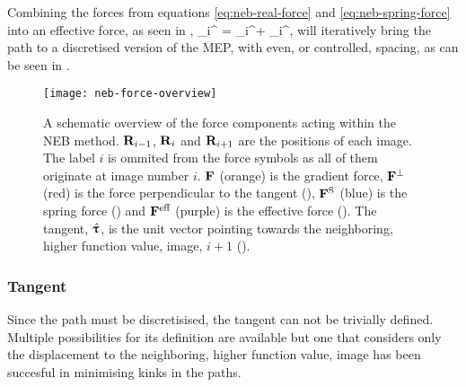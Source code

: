 Combining the forces from equations \ref{eq:neb-real-force} and \ref{eq:neb-spring-force} into an effective force, as seen in ,
\vF_i^ = \vF_i^\perp + \vF_i^,
\eeq
will iteratively bring the path to a discretised version of the MEP, with even, or controlled, spacing, as can be seen in .

\begin{figure}[h]
\begin{center}
\texttt{[image: neb-force-overview]}
\parbox{0.85\linewidth}{\caption{A schematic overview of the force components acting within the NEB method.
${\mathrm{\mathbf{\bm{R}}}}_{i-1}$, ${\mathrm{\mathbf{\bm{R}}}}_i$ and ${\mathrm{\mathbf{\bm{R}}}}_{i+1}$ are the positions of each image.
The label $i$ is ommited from the force symbols as all of them originate at image number $i$.
${\mathrm{\mathbf{\bm{F}}}}$ (orange) is the gradient force,
${\mathrm{\mathbf{\bm{F}}}}^\perp$ (red) is the force perpendicular to the tangent (),
${\mathrm{\mathbf{\bm{F}}}}^\text{S}$ (blue) is the spring force () and
${\mathrm{\mathbf{\bm{F}}}}^\text{eff}$ (purple) is the effective force ().
The tangent, $\hat{{\mathrm{\mathbf{\bm{\uptau}}}}}$, is the unit vector pointing towards the neighboring, higher function value, image, $i+1$ ().
}
\label{fig:neb-force-overview}
}
\end{center}
\end{figure}

\subsubsection{Tangent}
Since the path must be discretisised, the tangent can not be trivially defined.
Multiple possibilities for its definition are available but one that considers only the displacement to the neighboring, higher function value, image has been succesful in minimising kinks in the paths.~\cite{neb-tangent-2000}

